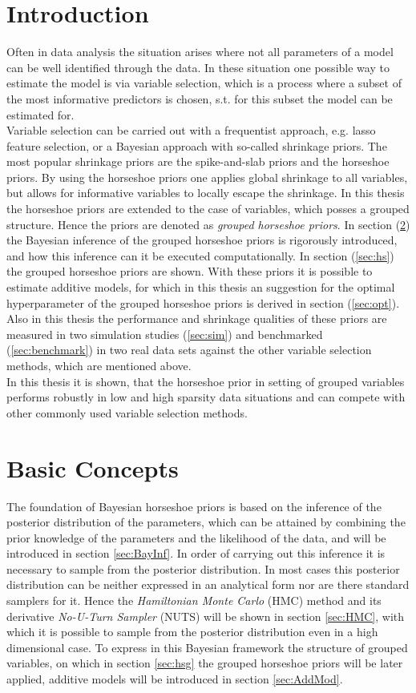\documentclass[12pt,letterpaper]{article}
\numberwithin{equation}{subsection}
\begin{document}
\section{Introduction}
Often in data analysis the situation arises where not all parameters of a model can be well identified through the data. In these situation one possible way to estimate the model is via variable selection, which is a process where a subset of the most informative predictors is chosen, s.t. for this subset the model can be estimated for. \\ 
Variable selection can be carried out with a frequentist approach, e.g. lasso feature selection, or a Bayesian approach with so-called shrinkage priors. The most popular shrinkage priors are the spike-and-slab priors and the horseshoe priors. By using the horseshoe priors one applies global shrinkage to all variables, but allows for informative variables to locally escape the shrinkage. In this thesis the horseshoe priors are extended to the case of variables, which posses a grouped structure. Hence the priors are denoted as \textit{grouped horseshoe priors}. In section (\ref{sec:basics}) the Bayesian inference of the grouped horseshoe priors is rigorously introduced, and how this inference can it be executed computationally. In section (\ref{sec:hs}) the grouped horseshoe priors are shown. With these priors it is possible to estimate additive models, for which in this thesis an suggestion for the optimal hyperparameter of the grouped horseshoe priors is derived in section (\ref{sec:opt}). Also in this thesis the performance and shrinkage qualities of these priors are measured in two simulation studies (\ref{sec:sim}) and benchmarked (\ref{sec:benchmark}) in two real data sets against the other variable selection methods, which are mentioned above. \\
In this thesis it is shown, that the horseshoe prior in setting of grouped variables performs robustly in low and high sparsity data situations and can compete with other commonly used variable selection methods.
\pagebreak

\section{Basic Concepts}
\label{sec:basics}
The foundation of Bayesian horseshoe priors is based on the inference of the posterior distribution of the parameters, which can be attained by combining the prior knowledge of the parameters and the likelihood of the data, and will be introduced in section \ref{sec:BayInf}. In order of carrying out this inference it is necessary to sample from the posterior distribution.
In most cases this posterior distribution can be neither expressed in an analytical form nor are there standard samplers for it. Hence the \textit{Hamiltonian Monte Carlo} (HMC) method and its derivative \textit{No-U-Turn Sampler} (NUTS) will be shown in section \ref{sec:HMC}, with which it is possible to sample from the posterior distribution even in a high dimensional case. To express in this Bayesian framework the structure of grouped variables, on which in section \ref{sec:hsg} the grouped horseshoe priors will be later applied,  additive models will be introduced in section \ref{sec:AddMod}.
\end{document}
